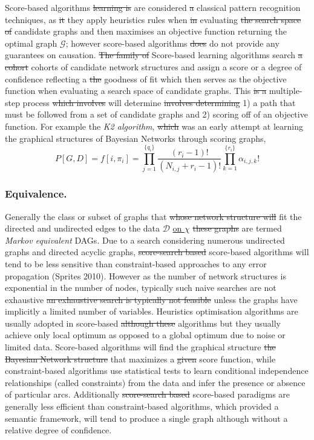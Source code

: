 \documentclass[7pt]{article}
\begin{document}
 
Score-based algorithms \st{learning is} are considered \st{a} classical pattern recognition techniques, as \st{it} they apply heuristics rules when \st{in} evaluating \st{the search space of} candidate graphs and then maximises an objective function returning the optimal graph $\mathcal{G}$; however score-based algorithms \st{does} do not provide any guarantees on causation. \st{The family of }Score-based learning algorithms search \st{a cohort} cohorts of candidate network structures and assign a score or a degree of confidence reflecting a \st{the} goodness of fit which then serves as the objective function when evaluating a search space of candidate graphs. This \st{is a} multiple-step process \st{which involves} will determine \st{involves determining} 1) a path that must be followed from a set of candidate graphs and 2) scoring off of an objective function.  For example the \emph{K2 algorithm}, \st{which} was an early attempt at learning the graphical structures of Bayesian Networks through scoring graphs, 
\begin{equation}
P[G,D] =  f[i,\pi_i ]  = \prod_{j=1}^{\{q_i\}} \dfrac{(r_i-1)!}{(N_{i,j}+r_i-1)!} \prod_{k=1}^{\{r_i\}} \alpha_{i,j,k} !
\end{equation}
\subsubsection{Equivalence.}
Generally the class or subset of graphs that \st{whose network structure will} fit the directed and undirected edges to the data $\mathcal{D}$ \underline{on $\chi$} \st{these graphs} are termed \emph{Markov equivalent} DAGs. Due to a search considering numerous undirected graphs and directed acyclic graphs, \st{score-search based} score-based algorithms will tend to be less sensitive than constraint-based approaches to any error propagation  (Sprites 2010).  However as the number of network structures  is exponential in the number of nodes, typically such naive searches are not exhaustive \st{an exhaustive search is typically not feasible} \cite{harary2014graphical} unless the graphs have implicitly a limited number of variables. Heuristics optimisation algorithms are usually adopted in score-based \st{although these} algorithms but they usually achieve only local optimum as opposed to a global optimum due to noise or limited data. Score-based algorithms  will find the graphical structure  \st{the Bayesian Network structure} that maximizes a \st{given} score function, while constraint-based algorithms use statistical tests to learn conditional independence relationships (called constraints) from the data and infer the presence or absence of particular arcs. Additionally \st{score-search based} score-based  paradigms are generally less efficient than constraint-based algorithms, which provided a semantic framework, will tend to produce a single graph although without a relative degree of confidence.
\end{document}

